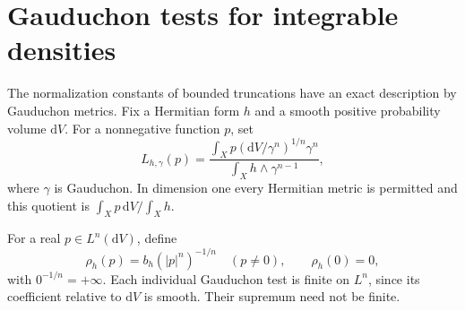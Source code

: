 \section{Gauduchon tests for integrable densities}
\label{sec:integrable-gauduchon-tests}

The normalization constants of bounded truncations have an exact description by Gauduchon metrics. Fix a Hermitian form $h$ and a smooth positive probability volume $\mathrm{d}V$. For a nonnegative function $p$, set
\[
 L_{h,\gamma}(p)=
 \frac{\displaystyle\int_Xp
              (\mathrm{d}V/\gamma^n)^{1/n}\gamma^n}
      {\displaystyle\int_Xh\wedge\gamma^{n-1}},
\]
where $\gamma$ is Gauduchon. In dimension one every Hermitian metric is permitted and this quotient is $\int_Xp\,\mathrm{d}V/\int_Xh$.

For a real $p\in L^n(\mathrm{d}V)$, define
\[
 \rho_h(p)=b_h(|p|^n)^{-1/n}\quad(p\ne0),\qquad \rho_h(0)=0,
\]
with $0^{-1/n}=+\infty$. Each individual Gauduchon test is finite on $L^n$, since its coefficient relative to $\mathrm{d}V$ is smooth. Their supremum need not be finite.

